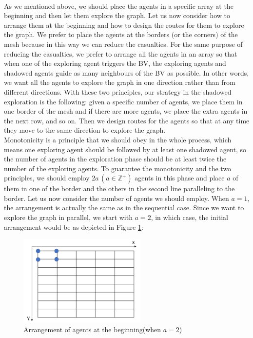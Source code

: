  \\

As we mentioned above, we should place the agents in a specific array at the beginning and then let them explore the graph. Let us now   consider how to arrange them at the beginning and how to design the routes for them to explore the graph. We prefer to place the agents at the borders (or the corners) of the mesh because in this way we can reduce the casualties. For the same purpose of reducing the casualties, we prefer to arrange all the agents in an array so that when one of the exploring agent triggers the BV, the exploring agents and shadowed agents guide as many neighbours of the BV as possible. In other words, we want all the agents to explore the graph in one direction rather than   from different directions. With these two principles, our strategy in the shadowed exploration is the following:
 given a specific number of agents, we place them in one border of the mesh and if there are more agents, we place the extra agents in the next  row, and so on. Then we design routes for the agents so that at any time they move to the same direction to explore the graph. \\
Monotonicity is a principle that we should obey in the whole process, which means one exploring agent should be followed by at least one shadowed agent, so the number of agents in the exploration phase should be at least twice the number of the exploring agents. To guarantee the monotonicity and the two principles, we should employ $2a\,(a\in\mathbb{Z}^+)$ agents in this phase and place $a$ of them in one of the border and the others in the second line paralleling to the border.
Let us now consider the number of agents we should employ.
When $a=1$, the arrangement is actually the same as in the sequential case. Since we want to explore the graph in parallel,  we start with  $a=2$, in which case, the initial arrangement would be as depicted in Figure \ref{fig:twoagent1}:
\begin{figure}[H]
  \centering  
  \includegraphics[width=2.5in]{figures/twoagent1.png}
  \caption{Arrangement of agents at the beginning(when $a=2$)}\label{fig:twoagent1}
\end{figure}


